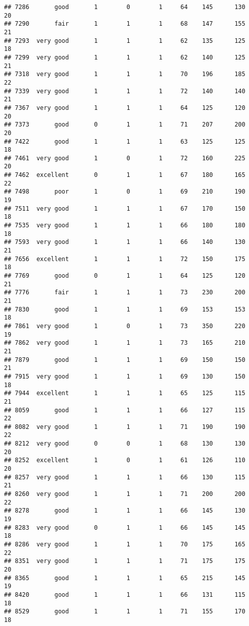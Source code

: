 \documentclass[]{article}
\begin{document}
\begin{verbatim}
## 7286       good       1        0        1     64    145      130  20
## 7290       fair       1        1        1     68    147      155  21
## 7293  very good       1        1        1     62    135      125  18
## 7299  very good       1        1        1     62    140      125  21
## 7318  very good       1        1        1     70    196      185  22
## 7339  very good       1        1        1     72    140      140  21
## 7367  very good       1        1        1     64    125      120  20
## 7373       good       0        1        1     71    207      200  20
## 7422       good       1        1        1     63    125      125  18
## 7461  very good       1        0        1     72    160      225  20
## 7462  excellent       0        1        1     67    180      165  22
## 7498       poor       1        0        1     69    210      190  19
## 7511  very good       1        1        1     67    170      150  18
## 7535  very good       1        1        1     66    180      180  18
## 7593  very good       1        1        1     66    140      130  21
## 7656  excellent       1        1        1     72    150      175  18
## 7769       good       0        1        1     64    125      120  21
## 7776       fair       1        1        1     73    230      200  21
## 7830       good       1        1        1     69    153      153  18
## 7861  very good       1        0        1     73    350      220  19
## 7862  very good       1        1        1     73    165      210  21
## 7879       good       1        1        1     69    150      150  21
## 7915  very good       1        1        1     69    130      150  18
## 7944  excellent       1        1        1     65    125      115  21
## 8059       good       1        1        1     66    127      115  22
## 8082  very good       1        1        1     71    190      190  22
## 8212  very good       0        0        1     68    130      130  20
## 8252  excellent       1        0        1     61    126      110  20
## 8257  very good       1        1        1     66    130      115  21
## 8260  very good       1        1        1     71    200      200  22
## 8278       good       1        1        1     66    145      130  19
## 8283  very good       0        1        1     66    145      145  18
## 8286  very good       1        1        1     70    175      165  22
## 8351  very good       1        1        1     71    175      175  20
## 8365       good       1        1        1     65    215      145  19
## 8420       good       1        1        1     66    131      115  18
## 8529       good       1        1        1     71    155      170  18

\end{verbatim}
\end{document}
